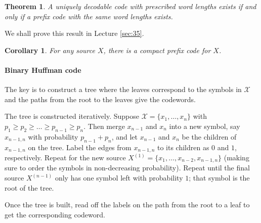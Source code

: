 \documentclass[a4paper, 11pt, openany]{book}
\numberwithin{equation}{section}
\theoremstyle{plain}
\newtheorem{theorem}	[equation]	{Theorem}
\newtheorem{corollary}	[equation]	{Corollary}
\theoremstyle{definition}
\begin{document}
\begin{theorem}
A uniquely decodable code with prescribed word lengths exists if and only if a prefix code with the same word lengths exists.
\end{theorem}

We shall prove this result in Lecture \ref{sec:35}.

\begin{corollary}
For any source $X$, there is a compact prefix code for $X$.
\end{corollary}


\paragraph{Binary Huffman code}


The key is to construct a tree where the leaves correspond to the symbols in  $\mathcal{X}$ and the paths from the root to the leaves give the codewords.

The tree is constructed iteratively. Suppose $\mathcal{X} = \{x_1, \dots, x_n\}$ with $p_1 \ge p_2 \ge  \dots \ge p_{n-1} \ge p_n$. Then merge $x_{n-1}$ and $x_n$ into a new symbol, say $x_{n-1, n}$ with probability $p_{n-1} + p_n$, and let $x_{n-1}$ and $x_n$ be the children of $x_{n-1, n}$ on the tree. Label the edges from $x_{n-1, n}$ to its children as $0$ and $1$, respectively. Repeat for the new source $X^{(1)} = \{x_1, \dots, x_{n-2}, x_{n-1, n} \}$ (making sure to order the symbols in non-decreasing probability). Repeat until the final source $X^{(n-1)}$ only has one symbol left with probability $1$; that symbol is the root of the tree. 

Once the tree is built, read off the labels on the path from the root to a leaf to get the corresponding codeword.
\end{document}
